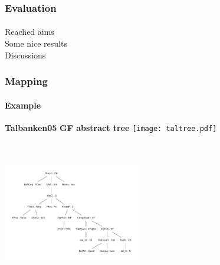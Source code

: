 \documentclass[10pt]{beamer}
\renewcommand{\baselinestretch}{1.5}
\begin{document}
%
%
%

\begin{frame}
 \renewcommand{\baselinestretch}{1.0}
\frametitle{Evaluation}
\framesubtitle{} 
Reached aims\\
Some nice results\\
Discussions\\
\end{frame}




\begin{frame}
\frametitle{Mapping}
\framesubtitle{Example} 
\small{\textbf{Talbanken05}}\hspace{160pt}
\small{\textbf{GF abstract tree}}
\texttt{[image: taltree.pdf]}
\includegraphics[width=170pt,height=200pt]{gftree.pdf}
\end{frame}
\end{document}
